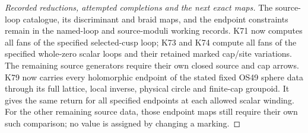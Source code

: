 \begin{proof}[Recorded reductions, attempted completions and the next exact maps]
The source-loop catalogue, its discriminant and braid maps,
and the endpoint constraints remain in the named-loop and
source-moduli working records. K71 now computes all fans of
the specified selected-cusp loop; K73 and K74 compute all
fans of the specified whole-zero scalar loops and their
retained marked cap/site variations. The remaining source
generators require their own closed source and cap arrows.
K79 now carries every holomorphic endpoint of the stated fixed
OS49 sphere data through its full lattice, local inverse, physical
circle and finite-cap groupoid. It gives the same return for all
specified endpoints at each allowed scalar winding. For the other
remaining source data, those endpoint maps still require their
own such comparison; no value is assigned by changing a marking.
\end{proof}
